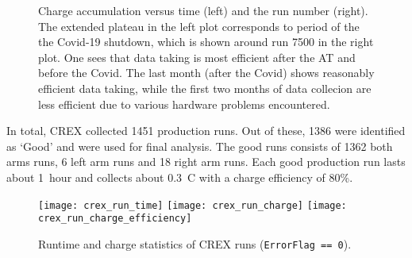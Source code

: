 \begin{figure}[!h]
    \caption[charge accumulation]
    {Charge accumulation versus time (left) and the run number (right). The
    extended plateau in the left plot corresponds to period of the the Covid-19 shutdown, 
    which is shown around run 7500 in the right plot. One sees that data taking 
    is most efficient after the AT and before the Covid. The last month (after the Covid) 
    shows reasonably efficient data taking, while the first two months of data
    collecion are less efficient due to various hardware problems encountered.}
\end{figure}

In total, CREX collected 1451 production runs. Out of these, 1386 were identified as `Good'
and were used for final analysis. The good runs consists of 1362 both arms runs,
6 left arm runs and 18 right arm runs. Each good production run lasts about 1~hour
and collects about 0.3~C with a charge efficiency of 80\%.
\begin{figure}[!h]
    \texttt{[image: crex\_run\_time]}
    \texttt{[image: crex\_run\_charge]}
    \texttt{[image: crex\_run\_charge\_efficiency]}
    \caption{Runtime and charge statistics of CREX runs (\texttt{ErrorFlag == 0}).}
\end{figure}

